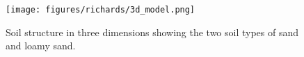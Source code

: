 \begin{figure}[!htbp]
\begin{center}
\texttt{[image: figures/richards/3d\_model.png]}
\end{center}
\caption{
Soil structure in three dimensions showing the two soil types of sand and loamy sand.
}
\label{fig:richards-3d_model}
\end{figure}
